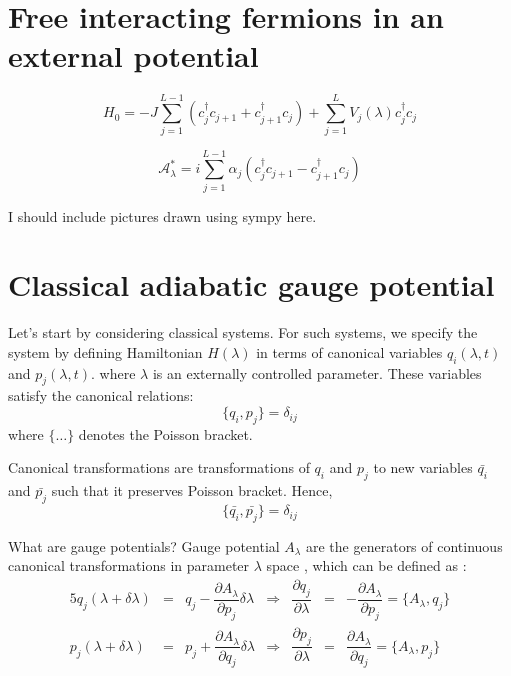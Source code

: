 \documentclass[11pt,a4paper]{article}
\begin{document}
\section{Free interacting fermions in an external potential}

\begin{equation}
H_0= -J \sum_{j=1}^{L-1} (c^{\dagger}_j c_{j+1} +c^{\dagger}_{j+1} c_{j}) + \sum_{j=1}^{L} V_j(\lambda) c^{\dagger}_jc_j
\end{equation}


\begin{equation}
\mathcal{A}^*_{\lambda}= i  \sum_{j=1}^{L-1} \alpha_j (c^{\dagger}_j c_{j+1} - c^{\dagger}_{j+1} c_{j}) 
\end{equation}

I should include pictures drawn using sympy here.


\section{Classical adiabatic gauge potential}
Let's start by considering classical systems. For such systems, we specify the system by defining Hamiltonian $H (\lambda)$ in terms of canonical variables $q_i (\lambda,t)$ and $p_j (\lambda,t)$. where $\lambda$ is an externally controlled parameter. These variables satisfy the canonical relations:
\begin{equation}
\{q_i,p_j \}=\delta_{ij} 
\end{equation}
where $\{\ldots \}$ denotes the Poisson bracket.

Canonical transformations are transformations of $q_i$ and $p_j$ to new variables $\bar{q_i}$ and $\bar{p_j}$ such that it preserves Poisson bracket. Hence, 
\begin{equation}
\{\bar{q_i},\bar{p_j} \}=\delta_{ij} 
\end{equation}

What are gauge potentials? Gauge potential $A_{\lambda}$  are the generators of continuous canonical transformations in parameter $\lambda$ space , which can be defined as :
\begin{alignat}{5}
q_j(\lambda + \delta \lambda) & =& q_j - \dfrac{\partial A_{\lambda}}{\partial p_j} \delta \lambda &\Rightarrow & \dfrac{\partial q_j}{\partial \lambda} &=& -\dfrac{\partial A_{\lambda}}{\partial p_j} = \{A_{\lambda},q_j \} \\
p_j(\lambda + \delta \lambda) & =& p_j + \dfrac{\partial A_{\lambda}}{\partial q_j} \delta \lambda & \Rightarrow & \dfrac{\partial p_j}{\partial \lambda} &=& \dfrac{\partial A_{\lambda}}{\partial q_j}=\{ A_{\lambda},p_j \}
\label{def_A}
\end{alignat}
\end{document}
